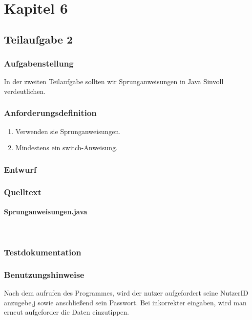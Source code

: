 \section{Kapitel 6}
\subsection{Teilaufgabe 2}
\subsubsection{Aufgabenstellung}
In der zweiten Teilaufgabe sollten wir Sprunganweisungen in Java Sinvoll verdeutlichen.

\subsubsection{Anforderungsdefinition}
\begin{enumerate}
	\item Verwenden sie Sprunganweisungen.
	\item Mindestens ein switch-Anweisung.
\end{enumerate}

\subsubsection{Entwurf}


\subsubsection{Quelltext}
\paragraph{Sprunganweisungen.java}\


\subsubsection{Testdokumentation}

\subsubsection{Benutzungshinweise}
Nach dem aufrufen des Programmes, wird der nutzer aufgefordert seine NutzerID anzugebe,j
sowie anschlie\ss end sein Passwort. Bei inkorrekter eingaben, wird man erneut aufgeforder
die Daten einzutippen.

